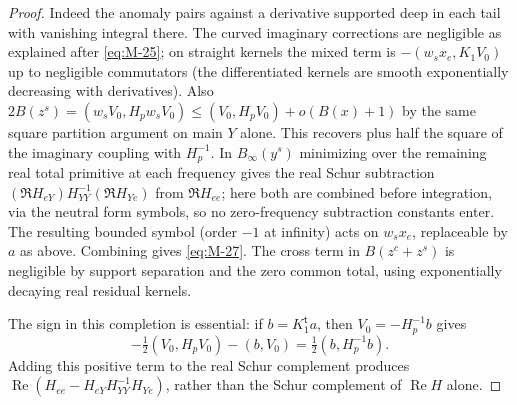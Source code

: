 \begin{proof}
Indeed the anomaly pairs against a derivative supported deep in each tail with vanishing integral there. The curved imaginary corrections are negligible as explained after \eqref{eq:M-25}; on straight kernels the mixed term is \(-(w_s x_e,K_1 V_0)\) up to negligible commutators (the differentiated kernels are smooth exponentially decreasing with derivatives). Also \(2 B(z^s)=(w_s V_0,H_p w_s V_0)\le(V_0,H_p V_0)+o(B(x)+1)\) by the same square partition argument on main \(Y\) alone. This recovers plus half the square of the imaginary coupling with \(H_p^{-1}\). In \(B_\infty(y^s)\) minimizing over the remaining real total primitive at each frequency gives the real Schur subtraction \((\Re H_{eY})H_{YY}^{-1}(\Re H_{Ye})\) from \(\Re H_{ee}\); here both are combined before integration, via the neutral form symbols, so no zero-frequency subtraction constants enter. The resulting bounded symbol (order \(-1\) at infinity) acts on \(w_s x_e\), replaceable by \(a\) as above. Combining gives \eqref{eq:M-27}. The cross term in \(B(z^c+z^s)\) is negligible by support separation and the zero common total, using exponentially decaying real residual kernels.


The sign in this completion is essential: if \(b=K_1^{\mathsf t}a\),
then \(V_0=-H_p^{-1}b\) gives
\[
 -\tfrac12(V_0,H_pV_0)-(b,V_0)
 =\tfrac12(b,H_p^{-1}b).
\]
Adding this positive term to the real Schur complement produces
\(\operatorname{Re}(H_{ee}-H_{eY}H_{YY}^{-1}H_{Ye})\), rather than
the Schur complement of \(\operatorname{Re}H\) alone.

\end{proof}


